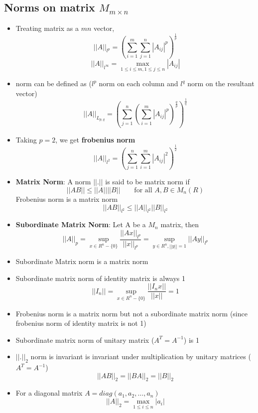 \documentclass{article}
\begin{document}
\subsection{Norms on matrix $M_{m\times n}$}
	\begin{itemize}
	\item Treating matrix as a $mn$ vector, 
	\[||A||_{l^p} = \left( \sum_{i=1}^m \sum_{j=1}^n |A_{ij}|^p \right)^\frac{1}{p} \]
	\[||A||_{l^\infty} = \max_{1\leq i\leq m, 1 \leq j \leq n} |A_{ij}| \]

	\item norm can be defined as ($l^{p}$ norm on each column and $l^q$ norm on the resultant vector)
	\[||A||_{L_{p,q}} = \left( \sum_{j=1}^n \left(\sum_{i=1}^m |A_{ij}|^p \right)^\frac{q}{p} \right)^\frac{1}{q} \]

	\item Taking $p=2$, we get \textbf{frobenius norm}
		\[||A||_{l^2} = \left( \sum_{j=1}^n \sum_{i=1}^m |A_{ij}|^2  \right)^\frac{1}{2}  \]

	\item \textbf{Matrix Norm}: A norm $||.||$ is said to be matrix norm if 
		\[||AB|| \leq ||A|| ||B|| \qquad \text{for all } A,B\in M_n(R)\]
	Frobenius norm is a matrix norm
	\[||AB||_{l^2} \leq ||A||_{l^2} ||B||_{l^2}\]

	\item \textbf{Subordinate Matrix Norm}: Let A be a $M_n$ matrix, then 
		\[\boxed{||A||_p = \sup_{x\in R^n-\{0\}} \frac{||Ax||_{l^p}}{||x||_{l^p}} =  \sup_{y\in R^n, ||y||=1} {||Ay||_{l^p}}} \]
	\item Subordinate Matrix norm is a matrix norm

	\item Subordinate matrix norm of identity matrix is always 1
		\[||I_n|| = \sup_{x\in R^n-\{0\}} \frac{||I_nx||}{||x||} =1\]

	\item Frobenius norm is a matrix norm but not a subordinate matrix norm (since frobenius norm of identity matrix is not 1)

	\item Subordinate matrix norm of unitary matrix ($A^T = A^{-1}$) is 1

	\item $||.||_2$ norm is invariant is invariant under multiplication by unitary matrices ($A^T = A^{-1} $)
		\[||AB||_2 = ||BA||_2 = ||B||_2 \]

	\item For a diagonal matrix $A = diag(a_1,a_2,\hdots,a_n)$
		\[||A||_2 = \max_{1 \leq i\leq n} |a_i|\]

	\end{itemize}
\end{document}
